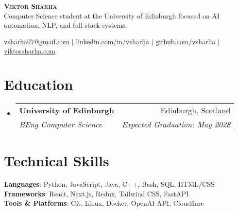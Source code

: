 \documentclass[letterpaper,11pt]{article}
\makeatletter
\newcommand{\resumeItem}[1]{
  \item\small{
    {#1 \vspace{-2pt}}
  }
}
\newcommand{\resumeSubheading}[4]{
  \vspace{-2pt}\item
    \begin{tabular*}{0.97\textwidth}[t]{l@{\extracolsep{\fill}}r}
      \textbf{#1} & #2 \\
      \textit{\small#3} & \textit{\small #4} \\
    \end{tabular*}\vspace{-7pt}
}
\newcommand{\resumeSubHeadingListStart}{\begin{itemize}[leftmargin=0.15in, label={}]}
\newcommand{\resumeSubHeadingListEnd}{\end{itemize}}
\newcommand{\resumeItemListStart}{\begin{itemize}}
\newcommand{\resumeItemListEnd}{\end{itemize}\vspace{-5pt}}
\makeatother
\begin{document}

\begin{center}
  \textbf{\Huge \scshape Viktor Sharha} \\ \vspace{6pt}
  {\small Computer Science student at the University of Edinburgh focused on AI automation, NLP, and full-stack systems.} \\ \vspace{4pt}

  \href{mailto:vsharha07@gmail.com}{\underline{vsharha07@gmail.com}} $|$
  \href{https://www.linkedin.com/in/vsharha/}{\underline{linkedin.com/in/vsharha}} $|$
  \href{https://github.com/vsharha/}{\underline{github.com/vsharha}} $|$
  \href{https://viktorsharha.com/}{\underline{viktorsharha.com}}
\end{center}

\section{Education}
\resumeSubHeadingListStart
\resumeSubheading
{University of Edinburgh}{Edinburgh, Scotland}
{BEng Computer Science}{Expected Graduation: May 2028}
\resumeSubHeadingListEnd


%
\section{Technical Skills}
\begin{itemize}[leftmargin=0.15in, label={}]
  \small{\item{
        \textbf{Languages}{: Python, JavaScript, Java, C++, Bash, SQL, HTML/CSS
        } \\
        \textbf{Frameworks}{: React, Next.js, Redux, Tailwind CSS, FastAPI} \\
        \textbf{Tools \& Platforms}{: Git, Linux, Docker, OpenAI API, Cloudflare} \\
        }}
\end{itemize}
\end{document}
